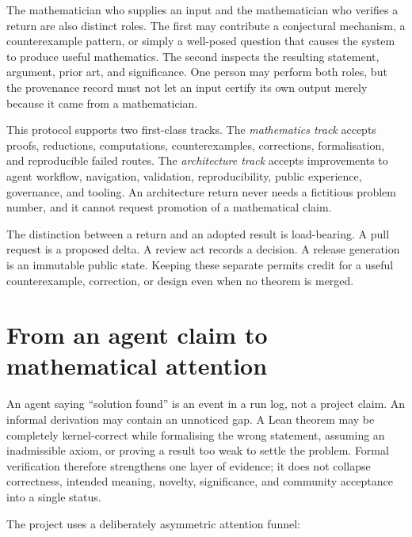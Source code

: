 \documentclass[10pt]{article}
\begin{document}
The mathematician who supplies an input and the mathematician who verifies a
return are also distinct roles.  The first may contribute a conjectural
mechanism, a counterexample pattern, or simply a well-posed question that
causes the system to produce useful mathematics.  The second inspects the
resulting statement, argument, prior art, and significance.  One person may
perform both roles, but the provenance record must not let an input certify
its own output merely because it came from a mathematician.

This protocol supports two first-class tracks.  The \emph{mathematics track}
accepts proofs, reductions, computations, counterexamples, corrections,
formalisation, and reproducible failed routes.  The \emph{architecture track}
accepts improvements to agent workflow, navigation, validation,
reproducibility, public experience, governance, and tooling.  An architecture
return never needs a fictitious problem number, and it cannot request
promotion of a mathematical claim.

The distinction between a return and an adopted result is load-bearing.  A
pull request is a proposed delta.  A review act records a decision.  A release
generation is an immutable public state.  Keeping these separate permits
credit for a useful counterexample, correction, or design even when no theorem
is merged.

\section{From an agent claim to mathematical attention}\label{sec:attention}

An agent saying ``solution found'' is an event in a run log, not a project
claim.  An informal derivation may contain an unnoticed gap.  A Lean theorem
may be completely kernel-correct while formalising the wrong statement,
assuming an inadmissible axiom, or proving a result too weak to settle the
problem.  Formal verification therefore strengthens one layer of evidence;
it does not collapse correctness, intended meaning, novelty, significance,
and community acceptance into a single status.

The project uses a deliberately asymmetric attention funnel:
\end{document}
